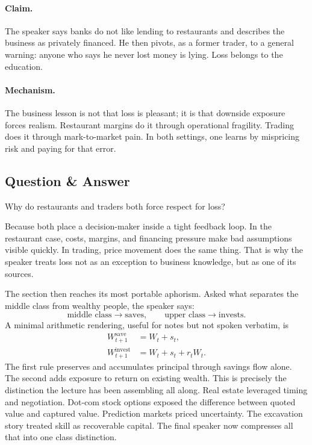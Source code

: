 \paragraph{Claim.}
The speaker says banks do not like lending to restaurants and describes the business as privately financed. He then pivots, as a former trader, to a general warning: anyone who says he never lost money is lying. Loss belongs to the education.

\paragraph{Mechanism.}
The business lesson is not that loss is pleasant; it is that downside exposure forces realism. Restaurant margins do it through operational fragility. Trading does it through mark-to-market pain. In both settings, one learns by mispricing risk and paying for that error.

\subsection{Question \& Answer}

Why do restaurants and traders both force respect for loss?

Because both place a decision-maker inside a tight feedback loop. In the restaurant case, costs, margins, and financing pressure make bad assumptions visible quickly. In trading, price movement does the same thing. That is why the speaker treats loss not as an exception to business knowledge, but as one of its sources.

The section then reaches its most portable aphorism. Asked what separates the middle class from wealthy people, the speaker says:
\begin{equation}
\text{middle class} \to \text{saves},
\qquad
\text{upper class} \to \text{invests}.
\end{equation}
A minimal arithmetic rendering, useful for notes but not spoken verbatim, is
\begin{align}
W_{t+1}^{\text{save}} &= W_t + s_t,\\
W_{t+1}^{\text{invest}} &= W_t + s_t + r_t W_t.
\end{align}
The first rule preserves and accumulates principal through savings flow alone. The second adds exposure to return on existing wealth. This is precisely the distinction the lecture has been assembling all along. Real estate leveraged timing and negotiation. Dot-com stock options exposed the difference between quoted value and captured value. Prediction markets priced uncertainty. The excavation story treated skill as recoverable capital. The final speaker now compresses all that into one class distinction.

